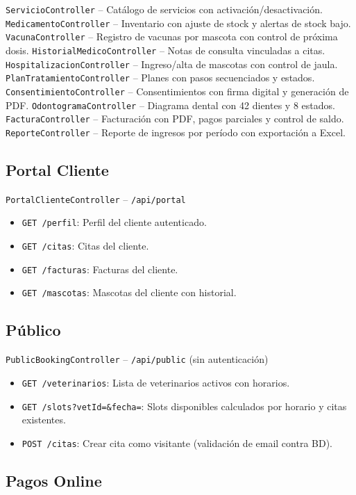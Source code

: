 \texttt{ServicioController} -- Cat\'alogo de servicios con activaci\'on/desactivaci\'on.
\texttt{MedicamentoController} -- Inventario con ajuste de stock y alertas de stock bajo.
\texttt{VacunaController} -- Registro de vacunas por mascota con control de pr\'oxima dosis.
\texttt{HistorialMedicoController} -- Notas de consulta vinculadas a citas.
\texttt{HospitalizacionController} -- Ingreso/alta de mascotas con control de jaula.
\texttt{PlanTratamientoController} -- Planes con pasos secuenciados y estados.
\texttt{ConsentimientoController} -- Consentimientos con firma digital y generaci\'on de PDF.
\texttt{OdontogramaController} -- Diagrama dental con 42 dientes y 8 estados.
\texttt{FacturaController} -- Facturaci\'on con PDF, pagos parciales y control de saldo.
\texttt{ReporteController} -- Reporte de ingresos por per\'iodo con exportaci\'on a Excel.

\subsection{Portal Cliente}

\texttt{PortalClienteController} -- \texttt{/api/portal}
\begin{itemize}
    \item \texttt{GET /perfil}: Perfil del cliente autenticado.
    \item \texttt{GET /citas}: Citas del cliente.
    \item \texttt{GET /facturas}: Facturas del cliente.
    \item \texttt{GET /mascotas}: Mascotas del cliente con historial.
\end{itemize}

\subsection{P\'ublico}

\texttt{PublicBookingController} -- \texttt{/api/public} (sin autenticaci\'on)
\begin{itemize}
    \item \texttt{GET /veterinarios}: Lista de veterinarios activos con horarios.
    \item \texttt{GET /slots?vetId=\&fecha=}: Slots disponibles calculados por horario y citas existentes.
    \item \texttt{POST /citas}: Crear cita como visitante (validaci\'on de email contra BD).
\end{itemize}

\subsection{Pagos Online}

